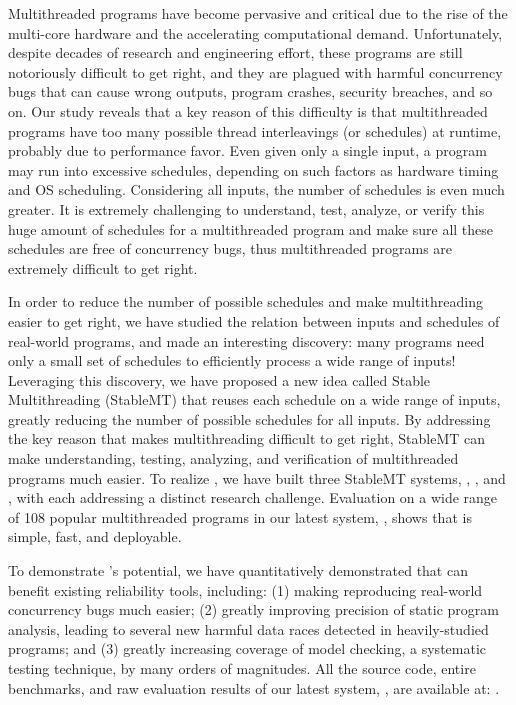 Multithreaded programs have become pervasive and critical due to the rise of the
multi-core hardware and the accelerating computational demand.
Unfortunately, despite decades of research and engineering effort, these
programs are still notoriously difficult to get right, and they are plagued with
harmful concurrency bugs that can cause wrong outputs, program crashes, security
breaches, and so on. Our study reveals that a key reason of this difficulty is
that multithreaded programs have too many possible thread interleavings (or
schedules) at runtime, probably due to performance favor. Even given only a
single input, a program may run into excessive schedules, depending on such
factors as hardware timing and OS scheduling. Considering all inputs, the number
of schedules is even much greater. It is extremely challenging to understand,
test, analyze, or verify this huge amount of schedules for a
multithreaded program and make sure all these schedules are free of concurrency
bugs, thus multithreaded programs are extremely difficult to get right.

In order to reduce the number of possible schedules and make multithreading
easier to get right, we have studied the
relation between inputs and schedules of real-world programs, and made an
interesting discovery: many programs need only a small set of schedules to
efficiently process a wide range of inputs! Leveraging this discovery, we have
proposed a new idea called Stable Multithreading (StableMT) that reuses each
schedule on a wide range of inputs, greatly reducing the number of possible
schedules for all inputs. By addressing the key reason that makes multithreading
difficult to get right, StableMT can make understanding,
testing, analyzing, and verification of multithreaded programs much
easier. To realize \smt, we have built three StableMT systems, \tern,
\peregrine, and \parrot, with each addressing a distinct research challenge.
Evaluation on a wide range of 108 popular multithreaded programs in
our latest \smt system, \parrot, shows that \smt is simple, fast, and
deployable.

To demonstrate \smt's potential, we have quantitatively demonstrated that \smt 
can benefit existing reliability tools, including: (1) making reproducing
real-world concurrency bugs much easier;  (2) greatly improving precision of
static program analysis, leading to several new harmful data races detected in
heavily-studied programs; and (3) greatly increasing coverage of model checking,
a systematic testing technique, by many orders of magnitudes. All the source
code, entire benchmarks, and raw evaluation results of our latest \smt system,
\parrot, are available at: \github.


